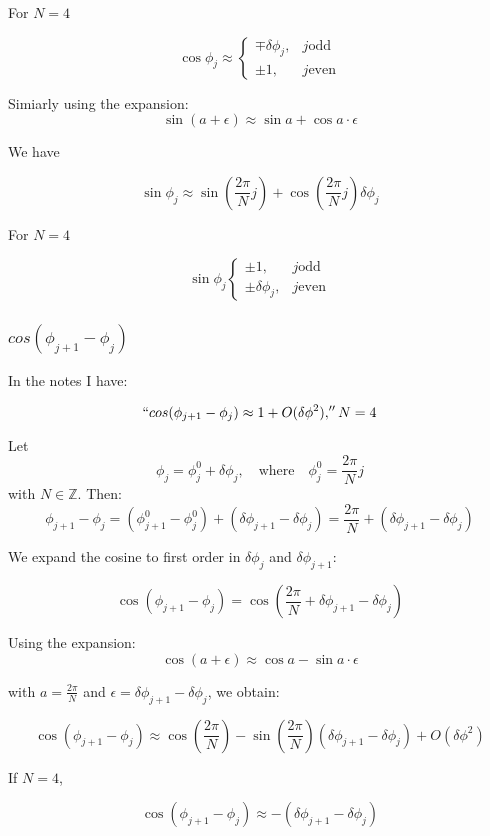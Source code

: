 \documentclass{article}
\begin{document}
For $N = 4$

\[\cos\phi_j \approx
\begin{cases}
    \mp \delta\phi_j, & j \text{odd} \\
    \pm 1, & j \text{even}
\end{cases}
\]

Simiarly using the expansion:
\[
\sin(a + \epsilon) \approx \sin a + \cos a \cdot \epsilon
\]

We have 

\[
\boxed{
\sin\phi_j \approx \sin( \frac{2\pi}{N}j) + \cos( \frac{2\pi}{N}j)\delta\phi_j
}
\]

For $N = 4$

\[\sin\phi_j 
\begin{cases}
    \pm 1, & j \text{odd} \\
    \pm \delta\phi_j, & j \text{even}
\end{cases}\]


\subsubsection{$cos(\phi_{j+1} - \phi_j)$}

In the notes I have:

\[``cos(\phi_{j+1} - \phi_j) \approx 1 + O(\delta \phi^2),'' N = 4\]

Let
\[
\phi_j = \phi_j^0 + \delta \phi_j, \quad \text{where} \quad \phi_j^0 = \frac{2\pi}{N} j
\]
with \( N \in \mathbb{Z} \). Then:
\[
\phi_{j+1} - \phi_j = \left( \phi_{j+1}^0 - \phi_j^0 \right) + \left( \delta \phi_{j+1} - \delta \phi_j \right) = \frac{2\pi}{N} + (\delta \phi_{j+1} - \delta \phi_j)
\]

We expand the cosine to first order in \( \delta \phi_j \) and \( \delta \phi_{j+1} \):

\[
\cos(\phi_{j+1} - \phi_j) = \cos\left( \frac{2\pi}{N} + \delta \phi_{j+1} - \delta \phi_j \right)
\]

Using the expansion:
\[
\cos(a + \epsilon) \approx \cos a - \sin a \cdot \epsilon
\]

with \( a = \frac{2\pi}{N} \) and \( \epsilon = \delta \phi_{j+1} - \delta \phi_j \), we obtain:

\[
\boxed{
\cos(\phi_{j+1} - \phi_j) \approx \cos\left( \frac{2\pi}{N} \right) - \sin\left( \frac{2\pi}{N} \right)(\delta \phi_{j+1} - \delta \phi_j) + O(\delta \phi ^2)
}
\]

If $N = 4$, 

\[
\cos(\phi_{j+1} - \phi_j) \approx  -(\delta \phi_{j+1} - \delta \phi_j)
\]
\end{document}

